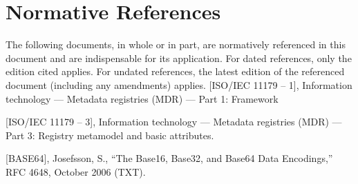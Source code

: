 \documentclass{article}
\begin{document}
	
\section{Normative References}

The following documents, in whole or in part, are normatively referenced in this document and are indispensable for its application. For dated references, only the edition cited applies. For undated references, the latest edition of the referenced document (including any amendments) applies.
[ISO/IEC 11179 – 1], Information technology — Metadata registries (MDR) — Part 1: Framework

[ISO/IEC 11179 – 3], Information technology — Metadata registries (MDR) — Part 3: Registry metamodel and basic attributes.

[BASE64],	Josefsson, S., “The Base16, Base32, and Base64 Data Encodings,” RFC 4648, October 2006 (TXT).
\end{document}
